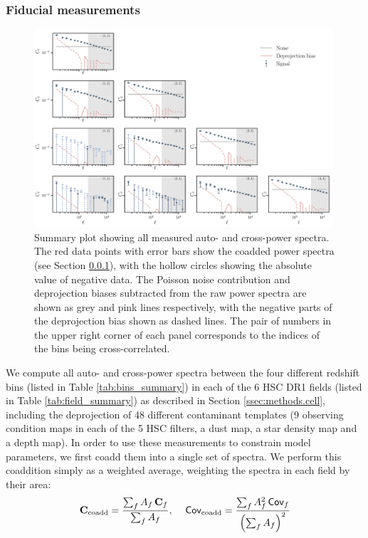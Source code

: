 \documentclass[a4paper,11pt]{article}
\begin{document}
    \subsubsection{Fiducial measurements}\label{sssec:results.spectra.fid}
      \begin{figure}
        \centering
        \includegraphics[width=0.99\textwidth]{figures/cls_summary.pdf}
        \caption{Summary plot showing all measured auto- and cross-power spectra. The red data points with error bars show the coadded power spectra (see Section \ref{sssec:results.spectra.fid}), with the hollow circles showing the absolute value of negative data. The Poisson noise contribution and deprojection biases subtracted from the raw power spectra are shown as grey and pink lines respectively, with the negative parts of the deprojection bias shown as dashed lines. The pair of numbers in the upper right corner of each panel corresponds to the indices of the bins being cross-correlated.}
        \label{fig:cls_summary}
      \end{figure}
      We compute all auto- and cross-power spectra between the four different redshift bins (listed in Table \ref{tab:bins_summary}) in each of the 6 HSC DR1 fields (listed in Table \ref{tab:field_summary}) as described in Section \ref{ssec:methods.cell}, including the deprojection of 48 different contaminant templates (9 observing condition maps in each of the 5 HSC filters, a dust map, a star density map and a depth map). In order to use these measurements to constrain model parameters, we first coadd them into a single set of spectra. We perform this coaddition simply as a weighted average, weighting the spectra in each field by their area:
      \begin{equation}
        {\bf C}_{\rm coadd}=\frac{\sum_f A_f\,{\bf C}_f}{\sum_f A_f}, \hspace{12pt}{\sf Cov}_{\rm coadd}=\frac{\sum_f A_f^2\,{\sf Cov}_f}{\left(\sum_f A_f\right)^2}
      \end{equation}
\end{document}
